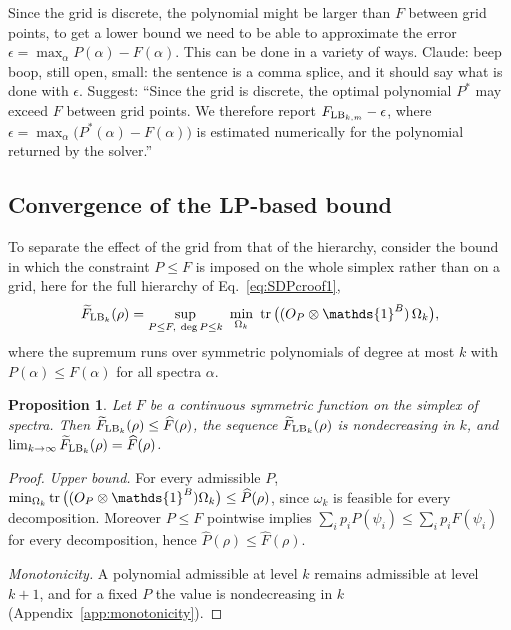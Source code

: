 \documentclass[aps,pra,twocolumn,showpacs,superscriptaddress,groupedaddress]{revtex4-2}
\newcommand{\one}[0]{\mathds{1}}
\renewcommand{\a}{\alpha}
\newcommand{\claude}[1]{{\color{claudeorange} Claude: beep boop, #1}}
\newcommand{\I}{\one}
\newtheorem{proposition}[theorem]{Proposition}
\begin{document}
\begin{widetext}
Since the grid is discrete, the polynomial might be larger than $F$ between grid points, to get a lower bound we need to be able to approximate the error $\epsilon = \max_\a P(\a)-F(\a)$. This can be done in a variety of ways.
\claude{still open, small: the sentence is a comma splice, and it should say what is done with $\epsilon$. Suggest: ``Since the grid is discrete, the optimal polynomial $P^*$ may exceed $F$ between grid points. We therefore report $F_{{\rm LB}_{k,m}}-\epsilon$, where $\epsilon=\max_\a\big(P^*(\a)-F(\a)\big)$ is estimated numerically for the polynomial returned by the solver.''}

\subsection{Convergence of the LP-based bound}\label{app:LPconvergence}
To separate the effect of the grid from that of the hierarchy, consider the bound in which the constraint $P\leq F$ is imposed on the whole simplex rather than on a grid, here for the full hierarchy of Eq.~\eqref{eq:SDPcroof1},
\begin{equation}\label{eq:FLBexact}
    \widetilde F_{{\rm LB}_k}(\rho)=\sup_{\substack{P\leq F,\ \deg P\leq k}}\ \min_{\Omega_k}\ \tr\big((O_P\otimes\I^B)\,\Omega_k\big),
\end{equation}
where the supremum runs over symmetric polynomials of degree at most $k$ with $P(\a)\leq F(\a)$ for all spectra $\a$.

\begin{proposition}\label{prop:LPconvergence}
Let $F$ be a continuous symmetric function on the simplex of spectra. Then $\widetilde F_{{\rm LB}_k}(\rho)\leq\widehat F(\rho)$, the sequence $\widetilde F_{{\rm LB}_k}(\rho)$ is nondecreasing in $k$, and $\lim_{k\to\infty}\widetilde F_{{\rm LB}_k}(\rho)=\widehat F(\rho)$.
\end{proposition}
\begin{proof}
\emph{Upper bound.} For every admissible $P$, $\min_{\Omega_k}\tr\big((O_P\otimes\I^B)\Omega_k\big)\leq\widehat P(\rho)$, since $\omega_k$ is feasible for every decomposition. Moreover $P\leq F$ pointwise implies $\sum_ip_iP(\psi_i)\leq\sum_ip_iF(\psi_i)$ for every decomposition, hence $\widehat P(\rho)\leq\widehat F(\rho)$.

\emph{Monotonicity.} A polynomial admissible at level $k$ remains admissible at level $k+1$, and for a fixed $P$ the value is nondecreasing in $k$ (Appendix~\ref{app:monotonicity}).


\end{proof}
\end{widetext}
\end{document}
